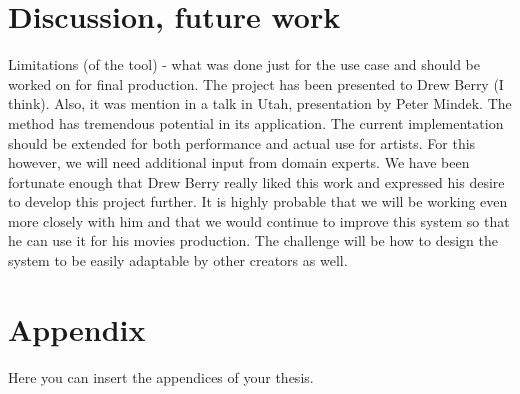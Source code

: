 \documentclass[
  digital, %
  table,   %
  nolof,     %
  nolot,     %
]{fithesis3}
\begin{document}
\chapter{Discussion, future work}
Limitations (of the tool) - what was done just for the use case and should be worked on for final production.
The project has been presented to Drew Berry (I think). Also, it was mention in a talk in Utah, presentation by Peter Mindek.
The method has tremendous potential in its application. The current implementation should be extended for both performance and actual use for artists. For this however, we will need additional input from domain experts. We have been fortunate enough that Drew Berry really liked this work and expressed his desire to develop this project further. It is highly probable that we will be working even more closely with him and that we would continue to improve this system so that he can use it for his movies production.
The challenge will be how to design the system to be easily adaptable by other creators as well.

\appendix %
\chapter{Appendix}
Here you can insert the appendices of your thesis.
\end{document}
